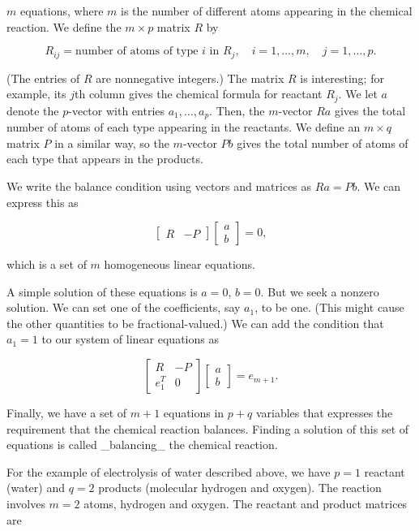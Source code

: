 \(m\) equations, where \(m\) is the number of different atoms appearing in the chemical reaction. We define the \(m\times p\) matrix \(R\) by

\[R_{ij}=\mbox{number of atoms of type $i$ in $R_{j}$},\quad i=1,\ldots,m,\quad j=1, \ldots,p.\]

(The entries of \(R\) are nonnegative integers.) The matrix \(R\) is interesting; for example, its \(j\)th column gives the chemical formula for reactant \(R_{j}\). We let \(a\) denote the \(p\)-vector with entries \(a_{1},\ldots,a_{p}\). Then, the \(m\)-vector \(Ra\) gives the total number of atoms of each type appearing in the reactants. We define an \(m\times q\) matrix \(P\) in a similar way, so the \(m\)-vector \(Pb\) gives the total number of atoms of each type that appears in the products.

We write the balance condition using vectors and matrices as \(Ra=Pb\). We can express this as

\[\left[\begin{array}{cc}R&-P\end{array}\right]\left[\begin{array}{c}a\\ b\end{array}\right]=0,\]

which is a set of \(m\) homogeneous linear equations.

A simple solution of these equations is \(a=0\), \(b=0\). But we seek a nonzero solution. We can set one of the coefficients, say \(a_{1}\), to be one. (This might cause the other quantities to be fractional-valued.) We can add the condition that \(a_{1}=1\) to our system of linear equations as

\[\left[\begin{array}{cc}R&-P\\ e_{1}^{T}&0\end{array}\right]\left[\begin{array}{c}a\\ b\end{array}\right]=e_{m+1}.\]

Finally, we have a set of \(m+1\) equations in \(p+q\) variables that expresses the requirement that the chemical reaction balances. Finding a solution of this set of equations is called _balancing_ the chemical reaction.

For the example of electrolysis of water described above, we have \(p=1\) reactant (water) and \(q=2\) products (molecular hydrogen and oxygen). The reaction involves \(m=2\) atoms, hydrogen and oxygen. The reactant and product matrices are

